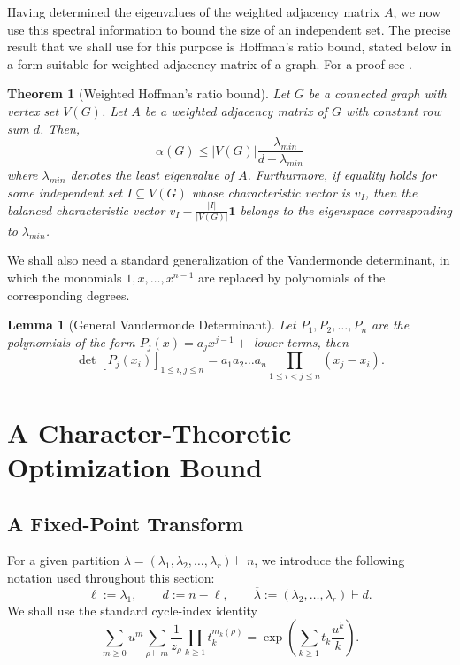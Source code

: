 \documentclass[12pt]{article}
\newtheorem{theorem}{Theorem}
\newtheorem{lemma}{Lemma}[section]
\theoremstyle{definition}
\newcommand{\1}{\mathbf 1}
\begin{document}
Having determined the eigenvalues of the weighted adjacency matrix $A$, we now use this spectral information to bound the size of an independent set. The precise result that we shall use for this purpose is Hoffman’s ratio bound, stated below in a form suitable for weighted adjacency matrix of a graph. For a proof see \cite{ellis2011intersecting,meagher2021erdHos}.

\begin{theorem}[Weighted Hoffman's ratio bound]
Let $G$ be a connected graph with vertex set $V(G)$. Let $A$ be a weighted adjacency matrix of $G$ with constant row sum $d$. Then,
\[\alpha(G) \le |V(G)| \frac{-\lambda_{min}}{d-\lambda_{min}}\]
    where $\lambda_{min}$ denotes the least eigenvalue of $A$. Furthurmore, if equality holds for some independent set $I \subseteq V(G)$ whose characteristic vector is $v_I$, then the balanced characteristic vector $v_I-\frac{|I|}{|V(G)|}\textbf{1}$ belongs to the eigenspace corresponding to $\lambda_{min}$.
\end{theorem}


We shall also need a standard generalization of the Vandermonde determinant, in which the monomials $1,x,\ldots,x^{n-1}$ are replaced by polynomials of the corresponding degrees. 


\begin{lemma}[General Vandermonde Determinant\cite{krattenthaler1999advanced}]\label{lem:General_Vandermonde} Let $P_1, P_2, \ldots, P_n$ are the polynomials of the form $P_j(x)=a_jx^{j-1}+$ lower terms, then $$\det[P_j(x_i)]_{1\leq i,j\leq n}=a_1a_2\ldots a_n \prod_{1\leq i<j\leq n}(x_j-x_i).$$ \end{lemma}
\section{A Character-Theoretic Optimization Bound}
\label{sec:optimization_bound}


\subsection{A Fixed-Point Transform}

For a given partition $\lambda=(\lambda_1,\lambda_2,\dots,\lambda_r)\vdash n$, we introduce the following notation used throughout this section:
$$
\ell:=\lambda_1,\qquad d:=n-\ell,\qquad
\overline{\lambda}:=(\lambda_2,\dots,\lambda_r)\vdash d.
$$
We shall use the standard cycle-index identity
\begin{equation}
\sum_{m\geq 0}u^m
\sum_{\rho\vdash m}
\frac{1}{z_\rho}
\prod_{k\geq 1}t_k^{m_k(\rho)}
=
\exp\left(
\sum_{k\geq 1}t_k\frac{u^k}{k}
\right).
\label{eq:cycle-index}
\end{equation}
\end{document}
